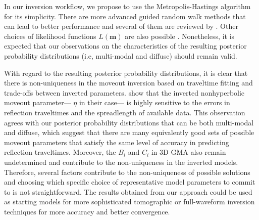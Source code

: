 
In our inversion workflow, we propose to use the Metropolis-Hastings algorithm for its simplicity. There are more advanced guided random walk methods that can lead to better performance and several of them are reviewed by \cite{sambridgemose}. Other choices of likelihood functions $L(\mathbf{m})$ are also possible \cite[]{mosetaran,tarantolabook}. Nonetheless, it is expected that our observations on the characteristics of the resulting posterior probability distributions (i.e, multi-modal and diffuse) should remain valid. 

With regard to the resulting posterior probability distributions, it is clear that there is non-uniqueness in the moveout inversion based on traveltime fitting and trade-offs between inverted parameters. \cite{nonphyperfeasibility} show that the inverted nonhyperbolic moveout parameter--- $\eta$ in their case--- is highly sensitive to the errors in reflection traveltimes and the spreadlength of available data. This observation agrees with our posterior probability distributions that can be both multi-modal and diffuse, which suggest that there are many equivalently good sets of possible moveout parameters that satisfy the same level of accuracy in predicting reflection traveltimes. Moreover, the $B_i$ and $C_i$ in 3D GMA also remain undetermined and contribute to the non-uniqueness in the inverted models. Therefore, several factors contribute to the non-uniqueness of possible solutions and choosing which specific choice of representative model parameters to commit to is not straightforward. The results obtained from our approach could be used as starting models for more sophisticated tomographic or full-waveform inversion techniques for more accuracy and better convergence. 


